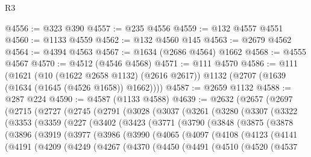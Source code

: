 \begin{lexlean}{R3}
\begin{coremodule}
@4556 := @323 @390
@4557 := @235 @4556
@4559 := @132 @4557 @4551
@4560 := @1133 @4559
@4562 := @132 @4560 @145
@4563 := @2679 @4562
@4564 := @4394 @4563
@4567 := @1634 (@2686 @4564) @1662
@4568 := @4555 @4567
@4570 := @4512 (@4546 @4568)
@4571 := @111 @4570
@4586 := @111
    (@1621
      (@10 (@1622 @2658 @1132) (@2616 @2617))
      @1132
      (@2707 (@1639 (@1634 (@1645 (@4526 @1658)) @1662))))
@4587 := @2659 @1132
@4588 := @287 @224
@4590 := @4587 (@1133 @4588)
@4639 := @2632
    (@2657
      (@2697
        (@2715
          (@2727
            (@2745
              (@2791
                (@3028
                  (@3037
                    (@3261
                      (@3280
                        (@3307
                          (@3322
                            (@3353
                              (@3359
                                (@227
                                  (@3402
                                    (@3423
                                      (@3771
                                        (@3790
                                          (@3848
                                            (@3875
                                              (@3878
                                                (@3896
                                                  (@3919
                                                    (@3977
                                                      (@3986
                                                        (@3990
                                                          (@4065
                                                            (@4097
                                                              (@4108
                                                                (@4123
                                                                  (@4141
                                                                    (@4191
                                                                      (@4209
                                                                        (@4249
                                                                          (@4267
                                                                            (@4370
                                                                              (@4450
                                                                                (@4491
                                                                                  (@4510
                                                                                    (@4520
                                                                                      (@4537

\end{coremodule}
\end{lexlean}
